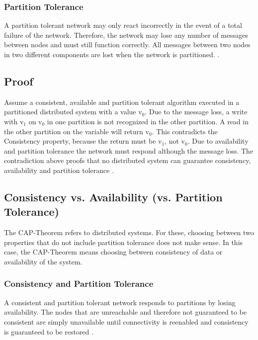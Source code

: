 \subsubsection*{Partition Tolerance}

A partition tolerant network may only react incorrectly in the event of a total failure of the network. Therefore, the network may lose any number of messages between nodes and must still function correctly. All messages between two nodes in two different components are lost when the network is partitioned. \parencite[3\psqq]{brewer:2002}.

\subsection{Proof}

Assume a consistent, available and partition tolerant algorithm executed in a partitioned distributed system with a value v$_{0}$. Due to the message loss, a write with v$_{1}$ on v$_{0}$ in one partition is not recognized in the other partition. A read in the other partition on the variable will return v$_{0}$. This contradicts the Consistency property, because the return must be v$_{1}$, not v$_{0}$. Due to availability and partition tolerance the network must respond although the message loss. The contradiction above proofs that no distributed system can guarantee consistency, availability and partition tolerance \parencite[4\psqq]{brewer:2002}.

\subsection*{Consistency vs. Availability (vs. Partition Tolerance)}

The \ac{CAP}-Theorem refers to distributed systems. For these, choosing between two properties that do not include partition tolerance does not make sense. In this case, the \ac{CAP}-Theorem means choosing between consistency of data or availability of the system.

\subsubsection*{Consistency and Partition Tolerance}

A consistent and partition tolerant network responds to partitions by losing availability. The nodes that are unreachable and therefore not guaranteed to be consistent are simply unavailable until connectivity is reenabled and consistency is guaranteed to be restored \parencite[6]{brewer:2002}.

